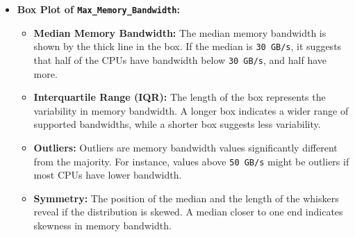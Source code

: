 \documentclass{article}
\begin{document}
\begin{itemize}
\begin{itemize}
\begin{itemize}
			\end{itemize}
			\item \textbf{Box Plot of \texttt{Max\_Memory\_Bandwidth}:}
			\begin{itemize}
				\item \textbf{Median Memory Bandwidth:} The median memory bandwidth is shown by the thick line in the box. If the median is \texttt{30 GB/s}, it suggests that half of the CPUs have bandwidth below \texttt{30 GB/s}, and half have more.
				\item \textbf{Interquartile Range (IQR):} The length of the box represents the variability in memory bandwidth. A longer box indicates a wider range of supported bandwidths, while a shorter box suggests less variability.
				\item \textbf{Outliers:} Outliers are memory bandwidth values significantly different from the majority. For instance, values above \texttt{50 GB/s} might be outliers if most CPUs have lower bandwidth.
				\item \textbf{Symmetry:} The position of the median and the length of the whiskers reveal if the distribution is skewed. A median closer to one end indicates skewness in memory bandwidth. 
			\end{itemize}
		\end{itemize}
	\end{itemize}
\end{document}
